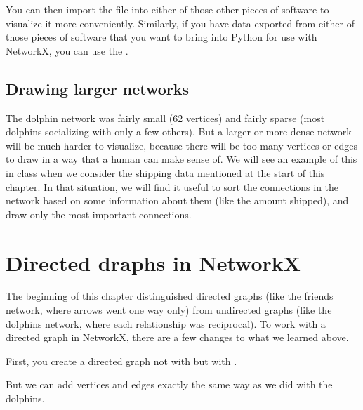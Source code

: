 \documentclass[letterpaper,10pt,english]{sphinxmanual}
\begin{document}
You can then import the  file into either of those other pieces of software to visualize it more conveniently.  Similarly, if you have data exported from either of those pieces of software that you want to bring into Python for use with NetworkX, you can use the .


\subsection{Drawing larger networks}
\label{\detokenize{chapter-15-networks:drawing-larger-networks}}
The dolphin network was fairly small (62 vertices) and fairly sparse (most dolphins socializing with only a few others).  But a larger or more dense network will be much harder to visualize, because there will be too many vertices or edges to draw in a way that a human can make sense of.  We will see an example of this in class when we consider the shipping data mentioned at the start of this chapter.  In that situation, we will find it useful to sort the connections in the network based on some information about them (like the amount shipped), and draw only the most important connections.


\section{Directed draphs in NetworkX}
\label{\detokenize{chapter-15-networks:directed-draphs-in-networkx}}
The beginning of this chapter distinguished directed graphs (like the friends network, where arrows went one way only) from undirected graphs (like the dolphins network, where each relationship was reciprocal).  To work with a directed graph in NetworkX, there are a few changes to what we learned above.

First, you create a directed graph not with  but with .

\begin{sphinxVerbatim}[commandchars=\\\{\}]
  
\end{sphinxVerbatim}

But we can add vertices and edges exactly the same way as we did with the dolphins.
\end{document}
